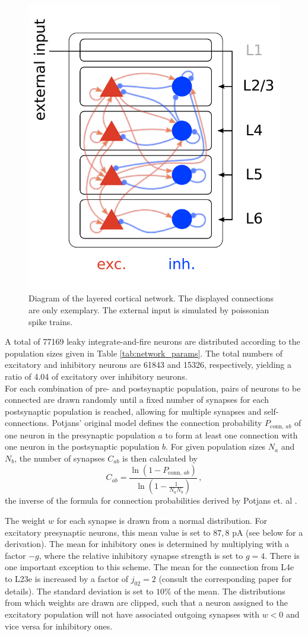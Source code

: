 \begin{figure}[htpb]
    \centering
    \includegraphics[width=0.5\linewidth]{../figures/diagram}
    \caption{Diagram of the layered cortical network. The displayed connections are only exemplary. 
    The external input is simulated by poissonian spike trains.}
    \label{fig:diagram}
\end{figure}

A total of 77169 leaky integrate-and-fire neurons are distributed according to the population
sizes given in Table \ref{tab:network_params}. The total numbers of excitatory and inhibitory 
neurons are 61843 and 15326, respectively, yielding a ratio of 4.04 of excitatory over inhibitory
neurons. \\
For each combination of pre- and postsynaptic population, pairs of neurons to be connected are drawn
randomly until a fixed number of synapses for each postsynaptic population is reached, 
allowing for multiple synapses and self-connections. 
Potjans' original model defines the connection probability $P_{\text{conn}, \,ab}$ 
of one neuron in the presynaptic population $a$ to form at least one connection with one neuron in 
the postsynaptic population $b$. For given population sizes $N_a$ and $N_b$, the number of 
synapses $C_{ab}$ is then calculated by
\begin{equation}
    C_{ab} = \frac{\ln \left( 1 - P_{\text{conn}, \,ab} \right)}{\ln \left( 1 - \frac{1}{N_a N_b} \right)} \, ,
    \label{eq:synapse_numbers}
\end{equation}
the inverse of the formula for connection probabilities derived by Potjans et. al \cite{potjans2014}.

The weight $w$ for each synapse is drawn from a normal distribution.
For excitatory presynaptic neurons, this mean value is set to $87,8$ pA (see below for 
a derivation). The mean for inhibitory ones is determined by multiplying 
with a factor $-g$, where the relative inhibitory synapse strength is set to 
$g = 4$. There is one important exception to this scheme.
The mean for the connection from L4e to L23e is increased by a factor of 
$j_{02} = 2$ (consult the corresponding paper \cite{potjans2014} for details). 
The standard deviation is set to $10\%$ of the mean. 
The distributions from which weights are drawn are clipped, 
such that a neuron assigned to the excitatory 
population will not have associated outgoing synapses with $w < 0$ 
and vice versa for inhibitory ones. 


